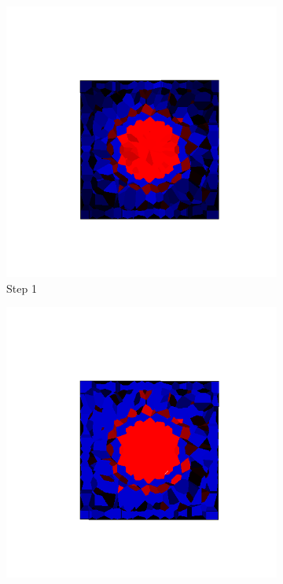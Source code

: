   \begin{figure}[ht!]
  \centering
      \begin{subfigure}{.25\textwidth}
        \centering
        \includegraphics[width=1.0\linewidth]{Files/Small_ASR/IS/DEP5-STEP(001).png}
      \caption{Step 1}
      \end{subfigure}%
      \begin{subfigure}{.25\textwidth}
        \centering
        \includegraphics[width=1.0\linewidth]{Files/Small_ASR/IS/DEP5-STEP(002).png}

\end{subfigure}
\end{figure}
